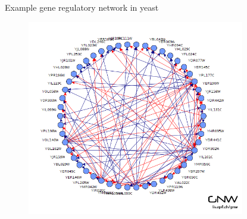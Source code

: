 \documentclass[aspectratio=1610]{beamer}					%
\begin{document}
\begin{frame}{Example gene regulatory network in yeast}

\begin{figure}
\includegraphics[width=9.5cm]{yeast-net.png}
\end{figure}

\end{frame}
\end{document}
